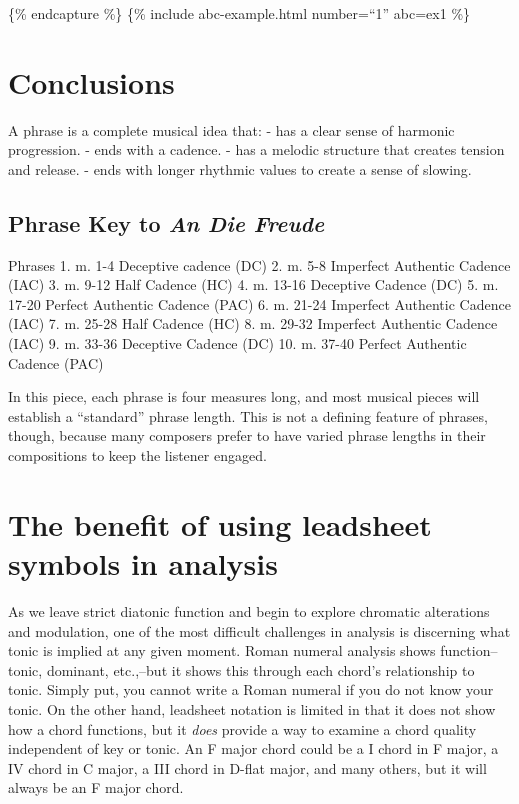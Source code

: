 \documentclass{book}
\begin{document}
\{\% endcapture \%\} \{\% include abc-example.html number=``1'' abc=ex1 \%\}

\hypertarget{conclusions-33}{%
\section{Conclusions}\label{conclusions-33}}

A phrase is a complete musical idea that: - has a clear sense of harmonic
progression. - ends with a cadence. - has a melodic structure that creates
tension and release. - ends with longer rhythmic values to create a sense of
slowing.

\hypertarget{phrase-key-to-an-die-freude}{%
\subsection{\texorpdfstring{Phrase Key to \emph{An Die
Freude}}{Phrase Key to An Die Freude}}\label{phrase-key-to-an-die-freude}}

Phrases 1. m. 1-4 Deceptive cadence (DC) 2. m. 5-8 Imperfect Authentic Cadence
(IAC) 3. m. 9-12 Half Cadence (HC) 4. m. 13-16 Deceptive Cadence (DC) 5. m.
17-20 Perfect Authentic Cadence (PAC) 6. m. 21-24 Imperfect Authentic Cadence
(IAC) 7. m. 25-28 Half Cadence (HC) 8. m. 29-32 Imperfect Authentic Cadence
(IAC) 9. m. 33-36 Deceptive Cadence (DC) 10. m. 37-40 Perfect Authentic
Cadence (PAC)

In this piece, each phrase is four measures long, and most musical pieces will
establish a ``standard'' phrase length. This is not a defining feature of
phrases, though, because many composers prefer to have varied phrase lengths
in their compositions to keep the listener engaged.

\hypertarget{the-benefit-of-using-leadsheet-symbols-in-analysis}{%
\section{The benefit of using leadsheet symbols in
analysis}\label{the-benefit-of-using-leadsheet-symbols-in-analysis}}

As we leave strict diatonic function and begin to explore chromatic
alterations and modulation, one of the most difficult challenges in analysis
is discerning what tonic is implied at any given moment. Roman numeral
analysis shows function--tonic, dominant, etc.,--but it shows this through
each chord's relationship to tonic. Simply put, you cannot write a Roman
numeral if you do not know your tonic. On the other hand, leadsheet notation
is limited in that it does not show how a chord functions, but it \emph{does}
provide a way to examine a chord quality independent of key or tonic. An F
major chord could be a I chord in F major, a IV chord in C major, a III chord
in D-flat major, and many others, but it will always be an F major chord.
\end{document}
